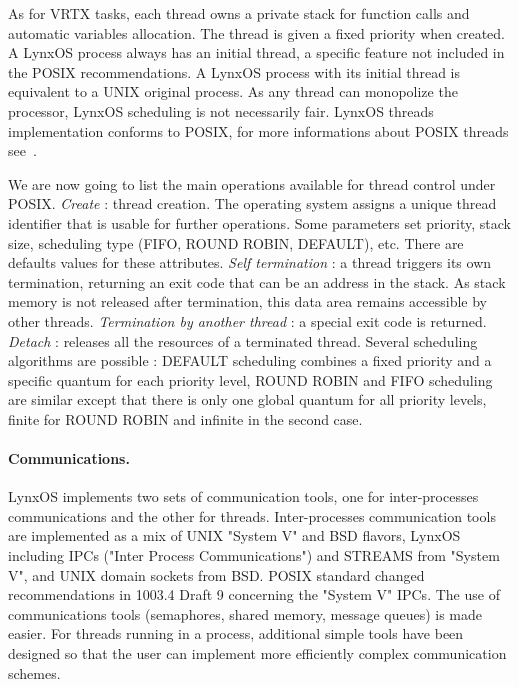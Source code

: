 \documentclass[10pt]{report}
\begin{document}
As for VRTX tasks, each thread owns a private stack for function calls and automatic variables allocation. The thread is given a fixed
priority when created. A LynxOS process always has an initial thread, a specific feature not included in the POSIX recommendations.
A LynxOS process with its initial thread is equivalent to a UNIX original process. As any thread can
monopolize the processor, LynxOS scheduling is not necessarily fair. LynxOS threads implementation conforms to POSIX, for more
informations about POSIX threads see~\cite{JMR:94}.

We are now going to list the main operations available for thread control under POSIX. {\em Create} : thread creation.
The operating system assigns a unique thread identifier that is usable for further operations. Some parameters set priority, stack size,
scheduling type (FIFO, ROUND ROBIN, DEFAULT), etc. There are defaults values for these attributes. {\em Self termination} :
a thread triggers its own termination, returning an exit code that can be an address in the stack. As stack memory is not released after
termination, this data area remains accessible by other threads. {\em Termination by another thread} : a special exit code is returned.
{\em Detach } : releases all the resources of a terminated thread. Several scheduling algorithms are possible : DEFAULT scheduling
combines a fixed priority and a specific quantum for each priority level, ROUND ROBIN and FIFO scheduling are similar except that there
is only one global quantum for all priority levels, finite for ROUND ROBIN and infinite in the second case.

\paragraph{Communications.} LynxOS implements two sets of communication tools, one for inter-processes communications and the other for
threads. Inter-processes communication tools are implemented as a mix of UNIX "System V" and BSD flavors, LynxOS including IPCs ("Inter
Process Communications") and STREAMS from "System V", and UNIX domain sockets from BSD. POSIX standard changed recommendations
in 1003.4 Draft 9 concerning the "System V" IPCs. The use of communications tools (semaphores, shared memory, message queues) is made
easier. For threads running in a process, additional simple tools have been designed so that the user can implement more efficiently
complex communication schemes.
\end{document}
